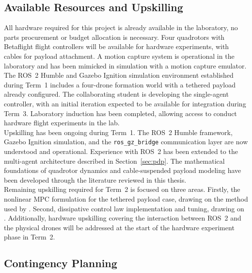 \subsection{Available Resources and Upskilling}

All hardware required for this project is already available in the laboratory, no parts procurement or budget allocation is necessary. Four quadrotors with Betaflight flight controllers will be available for hardware experiments, with cables for payload attachment. A motion capture system is operational in the laboratory and has been mimicked in simulation with a motion capture emulator. The ROS~2 Humble and Gazebo Ignition simulation environment established during Term~1 includes a four-drone formation world with a tethered payload already configured. The collaborating student is developing the single-agent controller, with an initial iteration expected to be available for integration during Term~3. Laboratory induction has been completed, allowing access to conduct hardware flight experiments in the lab. \\

Upskilling has been ongoing during Term~1. The ROS~2 Humble framework, Gazebo Ignition simulation, and the \texttt{ros\_gz\_bridge} communication layer are now understood and operational. Experience with ROS~2 has been extended to the multi-agent architecture described in Section~\ref{sec:pdp}. The mathematical foundations of quadrotor dynamics and cable-suspended payload modeling have been developed through the literature reviewed in this thesis. \\

Remaining upskilling required for Term~2 is focused on three areas. Firstly, the nonlinear MPC formulation for the tethered payload case, drawing on the method used by \cite{tudelft}. Second, dissipative control law implementation and tuning, drawing on \cite{quan2025swarm}. Additionally, hardware upskilling covering the interaction between ROS~2 and the physical drones will be addressed at the start of the hardware experiment phase in Term~2.

\subsection{Contingency Planning}

